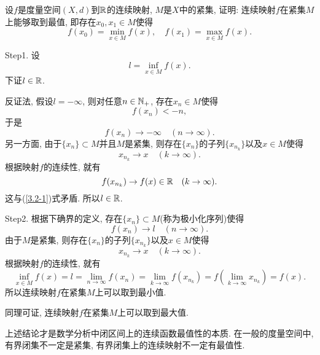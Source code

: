 \documentclass[UTF8,oneside,12pt]{article}  %
\makeatletter
\theoremstyle{DingLi1}
\numberwithin{equation}{section}
\newtheorem{remark}{\hskip 2em 注}[section]
\theoremstyle{DingLi2}
\newtheorem{example}{\hskip 2em 问题}[section]
\renewenvironment{proof}[1][\proofname]{\par%
\pushQED{\qed}%
\normalfont \topsep6\p@\@plus6\p@\relax%
\trivlist%
\item[\hskip\labelsep%
#1]\ignorespaces%
}{%
\popQED\endtrivlist\@endpefalse%
}
\renewcommand{\proofname}{\heiti\large\color{blue} 证明}%
\makeatother
\begin{document}
\begin{example}
设$f$是度量空间$(X,d)$到$\Bbb{R}$的连续映射, $M$是$X$中的紧集, 证明: 连续映射$f$在紧集$M$上能够取到最值, 即存在$x_0,x_1\in M$使得
$$f(x_0)=\min_{x\in M}f(x),\quad f(x_1)=\max_{x\in M}f(x).$$
\end{example}
\begin{proof}
Step1. 设
$$l=\inf_{x\in M}f(x).$$
下证$l\in \Bbb{R}$.

反证法, 假设$l=-\infty$, 则对任意$n\in \Bbb{N}_+$, 存在$x_n\in M$使得
\begin{equation*}
f(x_n)<-n,
\end{equation*}
于是
\begin{equation}\label{3.2-1}
f(x_n)\to -\infty\quad (n\to \infty).
\end{equation}
另一方面, 由于$\{x_n\}\subset M$并且$M$是紧集, 则存在$\{x_n\}$的子列$\{x_{n_k}\}$以及$x\in M$使得
$$x_{n_k}\to x\quad (k\to \infty).$$
根据映射$f$的连续性, 就有
$$f(x_{n_k})\to f(x)\in \Bbb{R}\quad (k\to \infty).$$
这与(\ref{3.2-1})式矛盾. 所以$l\in \Bbb{R}$.

Step2. 根据下确界的定义, 存在$\{x_n\}\subset M$(称为极小化序列)使得
$$f(x_n)\to l\quad (n\to \infty).$$
由于$M$是紧集, 则存在$\{x_n\}$的子列$\{x_{n_k}\}$以及$x\in M$使得
$$x_{n_k}\to x\quad (k\to \infty).$$
根据映射$f$的连续性, 就有
$$\inf_{x\in M}f(x)=l=\lim_{n\to \infty}f(x_n)=\lim_{k\to \infty}f(x_{n_k})=f\left(\lim_{k\to \infty} x_{n_k}\right)=f(x).$$
所以连续映射$f$在紧集$M$上可以取到最小值.

同理可证, 连续映射$f$在紧集$M$上可以取到最大值.
\end{proof}

\begin{remark}
上述结论才是数学分析中闭区间上的连续函数最值性的本质. 在一般的度量空间中, 有界闭集不一定是紧集, 有界闭集上的连续映射不一定有最值性.
\end{remark}
\end{document}
